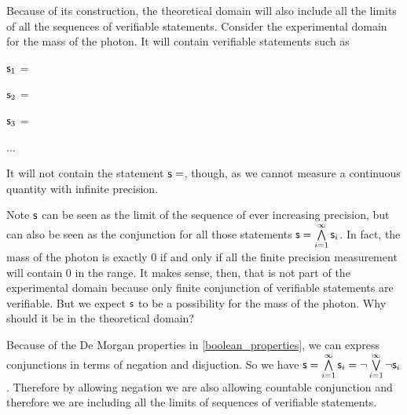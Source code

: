 \documentclass[11pt,letterpaper,fleqn]{memoir} %
\begin{document}
Because of its construction, the theoretical domain will also include all the limits of all the sequences of verifiable statements. Consider the experimental domain for the mass of the photon. It will contain verifiable statements such as
\begin{description}
	\item $\mathsf{s}_1$ =
	\item $\mathsf{s}_2$ =
	\item $\mathsf{s}_3$ =
	\item ...
\end{description}
It will not contain the statement $\mathsf{s}=$, though, as we cannot measure a continuous quantity with infinite precision.

Note $\mathsf{s}$ can be seen as the limit of the sequence of ever increasing precision, but can also be seen as the conjunction for all those statements $\mathsf{s}=\bigwedge\limits_{i=1}^{\infty} \mathsf{s}_i$. In fact, the mass of the photon is exactly 0 if and only if all the finite precision measurement will contain 0 in the range. It makes sense, then, that is not part of the experimental domain because only finite conjunction of verifiable statements are verifiable. But we expect $\mathsf{s}$ to be a possibility for the mass of the photon. Why should it be in the theoretical domain?

Because of the De Morgan properties in \ref{boolean_properties}, we can express conjunctions in terms of negation and disjuction. So we have $\mathsf{s}=\bigwedge\limits_{i=1}^{\infty} \mathsf{s}_i=\neg \bigvee\limits_{i=1}^{\infty} \neg\mathsf{s}_i$. Therefore by allowing negation we are also allowing countable conjunction and therefore we are including all the limits of sequences of verifiable statements.

\end{document}
